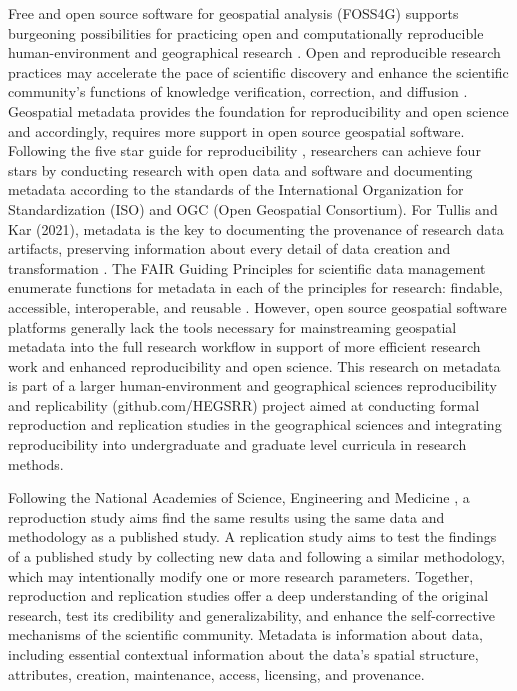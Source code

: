 \documentclass{isprs} %
\begin{document}
Free and open source software for geospatial analysis (FOSS4G) supports burgeoning possibilities for practicing open and computationally reproducible human-environment and geographical research \cite{Singleton2016}.
Open and reproducible research practices may accelerate the pace of scientific discovery and enhance the scientific community's functions of knowledge verification, correction, and diffusion \cite{Rey2009,Kedron2022}.
Geospatial metadata provides the foundation for reproducibility and open science and accordingly, requires more support in open source geospatial software.
Following the five star guide for reproducibility \cite{Wilson2021}, researchers can achieve four stars by conducting research with open data and software and documenting metadata according to the standards of the International Organization for Standardization (ISO) and OGC (Open Geospatial Consortium).
For Tullis and Kar (2021), metadata is the key to documenting the provenance of research data artifacts, preserving information about every detail of data creation and transformation \cite{Tullis2021}. The FAIR Guiding Principles for scientific data management enumerate functions for metadata in each of the principles for research: findable, accessible, interoperable, and reusable \cite{Wilkinson2016}.
However, open source geospatial software platforms generally lack the tools necessary for mainstreaming geospatial metadata into the full research workflow in support of more efficient research work and enhanced reproducibility and open science.
This research on metadata is part of a larger human-environment and geographical sciences reproducibility and replicability (github.com/HEGSRR) project aimed at conducting formal reproduction and replication studies in the geographical sciences and integrating reproducibility into undergraduate and graduate level curricula in research methods.

Following the National Academies of Science, Engineering and Medicine \cite{NASEM2019}, a reproduction study aims find the same results using the same data and methodology as a published study.
A replication study aims to test the findings of a published study by collecting new data and following a similar methodology, which may intentionally modify one or more research parameters.
Together, reproduction and replication studies offer a deep understanding of the original research, test its credibility and generalizability, and enhance the self-corrective mechanisms of the scientific community.
Metadata is information about data, including essential contextual information about the data's spatial structure, attributes, creation, maintenance, access, licensing, and provenance.
\end{document}
